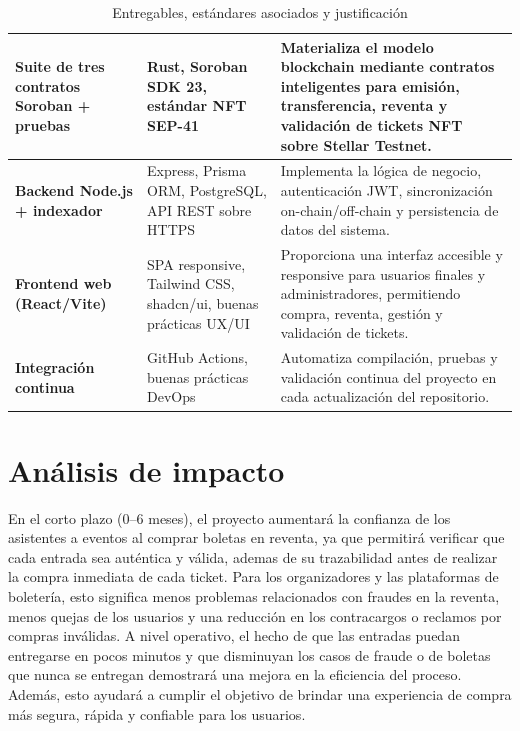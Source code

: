 \documentclass[12pt,a4paper]{article}
\begin{document}
\begin{table}[H]
\begin{tabularx}{\textwidth}{|p{3.8cm}|p{4cm}|X|}
\textbf{Suite de tres contratos Soroban + pruebas} &
Rust, Soroban SDK 23, estándar NFT SEP-41 &
Materializa el modelo blockchain mediante contratos inteligentes para emisión, transferencia, reventa y validación de tickets NFT sobre Stellar Testnet. \\
\hline

\textbf{Backend Node.js + indexador} &
Express, Prisma ORM, PostgreSQL, API REST sobre HTTPS &
Implementa la lógica de negocio, autenticación JWT, sincronización on-chain/off-chain y persistencia de datos del sistema. \\
\hline

\textbf{Frontend web (React/Vite)} &
SPA responsive, Tailwind CSS, shadcn/ui, buenas prácticas UX/UI &
Proporciona una interfaz accesible y responsive para usuarios finales y administradores, permitiendo compra, reventa, gestión y validación de tickets. \\
\hline

\textbf{Integración continua} &
GitHub Actions, buenas prácticas DevOps &
Automatiza compilación, pruebas y validación continua del proyecto en cada actualización del repositorio. \\
\hline

\end{tabularx}

\caption{Entregables, estándares asociados y justificación}
\label{tab:entregables_completos}
\normalsize
\end{table}

\section{Análisis de impacto}
En el corto plazo (0–6 meses), el proyecto aumentará la confianza de los asistentes a eventos al comprar boletas en reventa, ya que permitirá verificar que cada entrada sea auténtica y válida, ademas de su trazabilidad antes de realizar la compra inmediata de cada ticket. Para los organizadores y las plataformas de boletería, esto significa menos problemas relacionados con fraudes en la reventa, menos quejas de los usuarios y una reducción en los contracargos o reclamos por compras inválidas. A nivel operativo, el hecho de que las entradas puedan entregarse en pocos minutos y que disminuyan los casos de fraude o de boletas que nunca se entregan demostrará una mejora en la eficiencia del proceso. Además, esto ayudará a cumplir el objetivo de brindar una experiencia de compra más segura, rápida y confiable para los usuarios.
\end{document}
